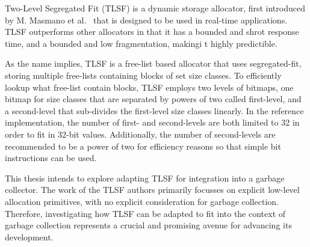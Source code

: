 
Two-Level Segregated Fit (TLSF) is a dynamic storage allocator, first introduced by M. Masmano et al.~\cite{TLSF} that is designed to be used in real-time applications. TLSF outperforms other allocators in that it has a bounded and shrot response time, and a bounded and low fragmentation, makingi t highly predictible.

As the name implies, TLSF is a free-list based allocator that uses segregated-fit, storing multiple free-lists containing blocks of set size classes. To efficiently lookup what free-list contain blocks, TLSF employs two levels of bitmaps, one bitmap for size classes that are separated by powers of two called first-level, and a second-level that sub-divides the first-level size classes linearly. In the reference implementation, the number of first- and second-levels are both limited to 32 in order to fit in 32-bit values. Additionally, the number of second-levels are recommended to be a power of two for efficiency reasons so that simple bit instructions can be used.

This thesis intends to explore adapting TLSF for integration into a garbage collector. The work of the TLSF authors primarily focusses on explicit low-level allocation primitives, with no explicit consideration for garbage collection. Therefore, investigating how TLSF can be adapted to fit into the context of garbage collection represents a crucial and promising avenue for advancing its development.

